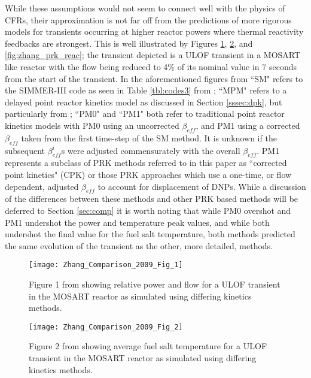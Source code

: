 \documentclass[review]{elsarticle}
\begin{document}
While these assumptions would not seem to connect well
with the physics of CFRs, their approximation is not far off from the
predictions of more rigorous models for transients occurring at higher
reactor powers where thermal reactivity feedbacks are strongest.
This is well illustrated by Figures
\ref{fig:zhang_prk_flow}, \ref{fig:zhang_prk_temp}, and 
\ref{fig:zhang_prk_reac};
the transient depicted is a ULOF transient in a MOSART like reactor with the
flow being reduced to 4\% of its nominal value in 7 seconds from the start
of the transient. In
the aforementioned figures from \cite{zhang_comparison_2009} ``SM" refers
to the SIMMER-III code as seen in Table \ref{tbl:codes3} from
\cite{rineiski_kinetics_2005}; ``MPM" refers to a delayed point reactor kinetics
model as discussed in Section \ref{sssec:dpk}, but particularly from
\cite{suzuki_reactivity-initiated-accident_2008}; ``PM0" and ``PM1" both
refer to traditional point reactor kinetics models with PM0 using an
uncorrected $\beta_{eff}$, and PM1 using a corrected $\beta_{eff}$ taken from
the first time-step of the SM method. It is unknown if the subsequent
$\beta_{eff}^{i}$s were adjusted commensurately with the overall $\beta_{eff}$.
PM1 represents a subclass of PRK methods referred to in this paper as
``corrected point kinetics" (CPK) or those PRK approaches which use a one-time, or
flow dependent, adjusted $\beta_{eff}$ to account for
displacement of DNPs.
While a discussion of the differences between these methods and other 
PRK based methods will be deferred to Section \ref{sec:comp}
it is worth noting that
while PM0 overshot and PM1 undershot the power and temperature peak values, and
while both undershot the final value for the fuel salt temperature, both methods
predicted the same evolution of the transient as the other, more detailed,
methods.

\begin{figure}[H]
   \centering
   \texttt{[image: Zhang\_Comparison\_2009\_Fig\_1]}
   \caption{Figure 1 from \cite{zhang_comparison_2009} showing relative power and flow for a 
   ULOF transient in the MOSART reactor as simulated using differing kinetics methods.} 
   \label{fig:zhang_prk_flow}
\end{figure}

\begin{figure}[H]
   \centering
   \texttt{[image: Zhang\_Comparison\_2009\_Fig\_2]}
   \caption{Figure 2 from \cite{zhang_comparison_2009} showing average fuel salt temperature for a
   ULOF transient in the MOSART reactor as simulated using differing kinetics methods.} 
   \label{fig:zhang_prk_temp}
\end{figure}
\end{document}
